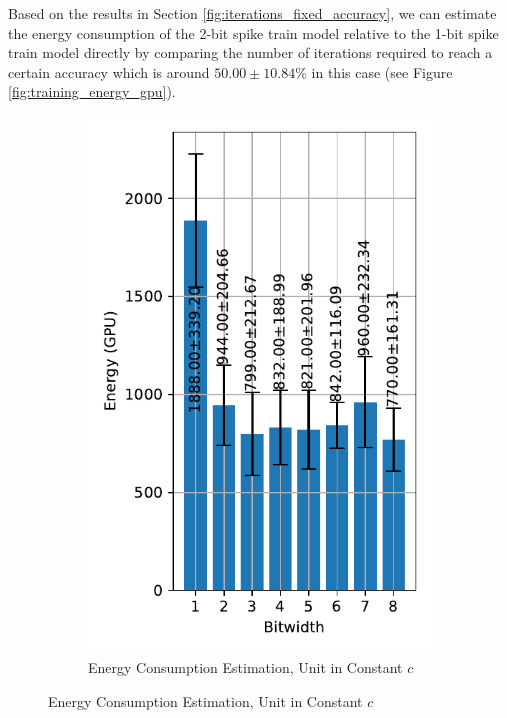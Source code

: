         Based on the results in Section \ref{fig:iterations_fixed_accuracy}, we can estimate the energy consumption of the 2-bit spike train model relative to the 1-bit spike train model directly by comparing the number of iterations required to reach a certain accuracy which is around $50.00\pm10.84\%$ in this case (see Figure \ref{fig:training_energy_gpu}). 
        \begin{figure}[!htpb]
            \centering
            \begin{subfigure}[H]{0.45\textwidth}
                \includegraphics[width=\textwidth]{../standard/FashionMNIST/plots/fashionmnist_train_energy_gpu.pdf}
                \caption{Energy Consumption Estimation, Unit in Constant $c$}
            \end{subfigure}

\end{figure}
